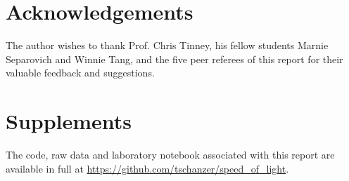 \documentclass[
    aps,
    prl,
    reprint,
    10pt,
    amsmath,
    amssymb,
    a4paper,
    longbibliography
]{revtex4-2}
\begin{document}
\section{Acknowledgements}

The author wishes to thank Prof. Chris Tinney, his fellow
students Marnie Separovich and Winnie Tang, and the five peer referees
of this report for their valuable feedback and suggestions.


\section{Supplements}

The code, raw data and laboratory notebook associated with this report
are available in full at \url{https://github.com/tschanzer/speed_of_light}.



\end{document}
